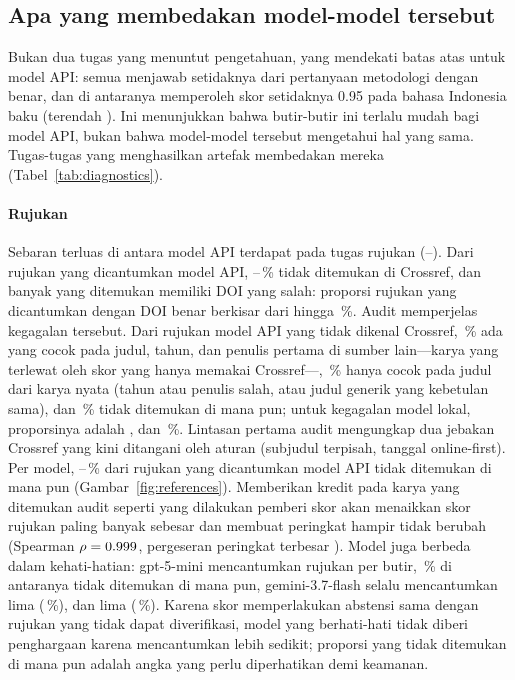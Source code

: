\subsection{Apa yang membedakan model-model tersebut}
\label{sec:separates}


Bukan dua tugas yang menuntut pengetahuan, yang mendekati batas atas untuk model API: semua \NApi{} menjawab setidaknya \MethApiMin{} dari pertanyaan metodologi dengan benar, dan \LangCeil{} di antaranya memperoleh skor setidaknya 0.95 pada bahasa Indonesia baku (terendah \LangApiMin{}). Ini menunjukkan bahwa butir-butir ini terlalu mudah bagi model API, bukan bahwa model-model tersebut mengetahui hal yang sama. Tugas-tugas yang menghasilkan artefak membedakan mereka (Tabel~\ref{tab:diagnostics}).

\paragraph{Rujukan} Sebaran terluas di antara model API terdapat pada tugas rujukan (\RefApiMin{}--\RefApiMax{}). Dari rujukan yang dicantumkan model API, \HalApiMin{}--\HalApiMax{}\,\% tidak ditemukan di Crossref, dan banyak yang ditemukan memiliki DOI yang salah: proporsi rujukan yang dicantumkan dengan DOI benar berkisar dari \DoiApiMin{} hingga \DoiApiMax{}\,\%. Audit memperjelas kegagalan tersebut. Dari \AuditApiNF{} rujukan model API yang tidak dikenal Crossref, \AuditApiExact{}\,\% ada yang cocok pada judul, tahun, dan penulis pertama di sumber lain---karya yang terlewat oleh skor yang hanya memakai Crossref---, \AuditApiTitle{}\,\% hanya cocok pada judul dari karya nyata (tahun atau penulis salah, atau judul generik yang kebetulan sama), dan \AuditApiNone{}\,\% tidak ditemukan di mana pun; untuk \AuditLocNF{} kegagalan model lokal, proporsinya adalah \AuditLocExact{}, \AuditLocTitle{} dan \AuditLocNone{}\,\%. Lintasan pertama audit mengungkap dua jebakan Crossref yang kini ditangani oleh aturan (subjudul terpisah, tanggal online-first). Per model, \NoneApiMin{}--\NoneApiMax{}\,\% dari rujukan yang dicantumkan model API tidak ditemukan di mana pun (Gambar~\ref{fig:references}). Memberikan kredit pada karya yang ditemukan audit seperti yang dilakukan pemberi skor akan menaikkan skor rujukan paling banyak sebesar \VerRefMaxGain{} dan membuat peringkat hampir tidak berubah (Spearman $\rho=0.999{}$, pergeseran peringkat terbesar \VerMaxShift{}). Model juga berbeda dalam kehati-hatian: gpt-5-mini mencantumkan \RefsGptFiveMini{} rujukan per butir, \NoneGptFiveMini{}\,\% di antaranya tidak ditemukan di mana pun, gemini-3.7-flash selalu mencantumkan lima (\NoneGeminiThreeSevenFlash{}\,\%), dan \TopName{} lima (\NoneKimiKThree{}\,\%). Karena skor memperlakukan abstensi sama dengan rujukan yang tidak dapat diverifikasi, model yang berhati-hati tidak diberi penghargaan karena mencantumkan lebih sedikit; proporsi yang tidak ditemukan di mana pun adalah angka yang perlu diperhatikan demi keamanan.

